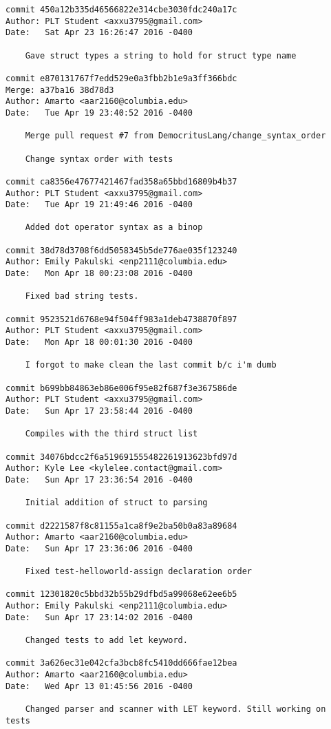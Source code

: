 \begin{lstlisting}[backgroundcolor=\color{white}]
commit 450a12b335d46566822e314cbe3030fdc240a17c
Author: PLT Student <axxu3795@gmail.com>
Date:   Sat Apr 23 16:26:47 2016 -0400

    Gave struct types a string to hold for struct type name

commit e870131767f7edd529e0a3fbb2b1e9a3ff366bdc
Merge: a37ba16 38d78d3
Author: Amarto <aar2160@columbia.edu>
Date:   Tue Apr 19 23:40:52 2016 -0400

    Merge pull request #7 from DemocritusLang/change_syntax_order
    
    Change syntax order with tests

commit ca8356e47677421467fad358a65bbd16809b4b37
Author: PLT Student <axxu3795@gmail.com>
Date:   Tue Apr 19 21:49:46 2016 -0400

    Added dot operator syntax as a binop

commit 38d78d3708f6dd5058345b5de776ae035f123240
Author: Emily Pakulski <enp2111@columbia.edu>
Date:   Mon Apr 18 00:23:08 2016 -0400

    Fixed bad string tests.

commit 9523521d6768e94f504ff983a1deb4738870f897
Author: PLT Student <axxu3795@gmail.com>
Date:   Mon Apr 18 00:01:30 2016 -0400

    I forgot to make clean the last commit b/c i'm dumb

commit b699bb84863eb86e006f95e82f687f3e367586de
Author: PLT Student <axxu3795@gmail.com>
Date:   Sun Apr 17 23:58:44 2016 -0400

    Compiles with the third struct list

commit 34076bdcc2f6a519691555482261913623bfd97d
Author: Kyle Lee <kylelee.contact@gmail.com>
Date:   Sun Apr 17 23:36:54 2016 -0400

    Initial addition of struct to parsing

commit d2221587f8c81155a1ca8f9e2ba50b0a83a89684
Author: Amarto <aar2160@columbia.edu>
Date:   Sun Apr 17 23:36:06 2016 -0400

    Fixed test-helloworld-assign declaration order

commit 12301820c5bbd32b55b29dfbd5a99068e62ee6b5
Author: Emily Pakulski <enp2111@columbia.edu>
Date:   Sun Apr 17 23:14:02 2016 -0400

    Changed tests to add let keyword.

commit 3a626ec31e042cfa3bcb8fc5410dd666fae12bea
Author: Amarto <aar2160@columbia.edu>
Date:   Wed Apr 13 01:45:56 2016 -0400

    Changed parser and scanner with LET keyword. Still working on tests


\end{lstlisting}
